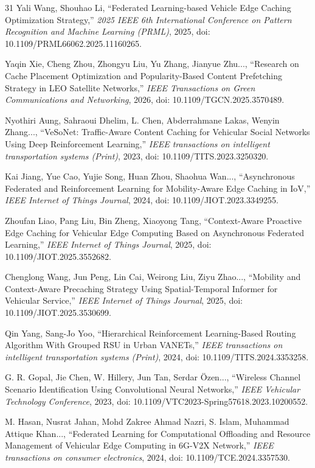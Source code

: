 \documentclass[journal]{IEEEtran}
\begin{document}
\begin{thebibliography}{31}
Yali Wang, Shouhao Li, ``Federated Learning-based Vehicle Edge Caching Optimization Strategy,'' \textit{2025 IEEE 6th International Conference on Pattern Recognition and Machine Learning (PRML)}, 2025, doi: 10.1109/PRML66062.2025.11160265.

Yaqin Xie, Cheng Zhou, Zhongyu Liu, Yu Zhang, Jianyue Zhu..., ``Research on Cache Placement Optimization and Popularity-Based Content Prefetching Strategy in LEO Satellite Networks,'' \textit{IEEE Transactions on Green Communications and Networking}, 2026, doi: 10.1109/TGCN.2025.3570489.

Nyothiri Aung, Sahraoui Dhelim, L. Chen, Abderrahmane Lakas, Wenyin Zhang..., ``VeSoNet: Traffic-Aware Content Caching for Vehicular Social Networks Using Deep Reinforcement Learning,'' \textit{IEEE transactions on intelligent transportation systems (Print)}, 2023, doi: 10.1109/TITS.2023.3250320.

Kai Jiang, Yue Cao, Yujie Song, Huan Zhou, Shaohua Wan..., ``Asynchronous Federated and Reinforcement Learning for Mobility-Aware Edge Caching in IoV,'' \textit{IEEE Internet of Things Journal}, 2024, doi: 10.1109/JIOT.2023.3349255.

Zhoufan Liao, Pang Liu, Bin Zheng, Xiaoyong Tang, ``Context-Aware Proactive Edge Caching for Vehicular Edge Computing Based on Asynchronous Federated Learning,'' \textit{IEEE Internet of Things Journal}, 2025, doi: 10.1109/JIOT.2025.3552682.

Chenglong Wang, Jun Peng, Lin Cai, Weirong Liu, Ziyu Zhao..., ``Mobility and Context-Aware Precaching Strategy Using Spatial-Temporal Informer for Vehicular Service,'' \textit{IEEE Internet of Things Journal}, 2025, doi: 10.1109/JIOT.2025.3530699.

Qin Yang, Sang-Jo Yoo, ``Hierarchical Reinforcement Learning-Based Routing Algorithm With Grouped RSU in Urban VANETs,'' \textit{IEEE transactions on intelligent transportation systems (Print)}, 2024, doi: 10.1109/TITS.2024.3353258.

G. R. Gopal, Jie Chen, W. Hillery, Jun Tan, Serdar Özen..., ``Wireless Channel Scenario Identification Using Convolutional Neural Networks,'' \textit{IEEE Vehicular Technology Conference}, 2023, doi: 10.1109/VTC2023-Spring57618.2023.10200552.

M. Hasan, Nusrat Jahan, Mohd Zakree Ahmad Nazri, S. Islam, Muhammad Attique Khan..., ``Federated Learning for Computational Offloading and Resource Management of Vehicular Edge Computing in 6G-V2X Network,'' \textit{IEEE transactions on consumer electronics}, 2024, doi: 10.1109/TCE.2024.3357530.


\end{thebibliography}
\end{document}
